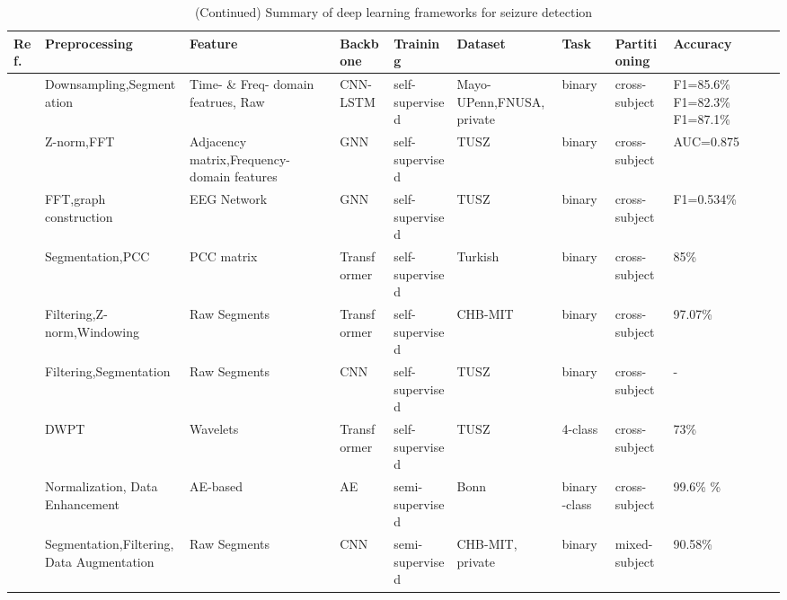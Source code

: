 \begin{table*}[ht]
\renewcommand{\arraystretch}{1.2}
\caption*{(Continued) Summary of deep learning frameworks for seizure detection}
\footnotesize
\begin{tabular}{p{0.4cm}p{2.8cm}p{2cm}p{1.5cm}p{1.9cm}p{1.9cm}p{0.8cm}p{1.8cm}p{1.5cm}}
\hline
\textbf{Ref.} & \textbf{Preprocessing} & \textbf{Feature} & \textbf{Backbone} & \textbf{Training} & \textbf{Dataset} & \textbf{Task} & \textbf{Partitioning} & \textbf{Accuracy} \\
\hline
~\cite{yuan2024ppi} & Downsampling,\newline Segmentation & Time- \& Freq- domain featrues, Raw & CNN-LSTM & self-supervised & Mayo-UPenn,\newline FNUSA, \newline private & binary & cross-subject & F1=85.6\% \newline F1=82.3\% \newline F1=87.1\% \\
~\cite{tang2021self} & Z-norm,FFT & Adjacency matrix,Frequency-domain features & GNN & self-supervised & TUSZ & binary & cross-subject & AUC=0.875 \\
~\cite{ho2023self} & FFT,graph construction & EEG Network & GNN & self-supervised & TUSZ & binary & cross-subject & F1=0.534\% \\
~\cite{lih2023epilepsynet} & Segmentation,PCC & PCC matrix & Transformer & self-supervised & Turkish & binary & cross-subject & 85\% \\
~\cite{XIAO2024105464} & Filtering,Z-norm,\newline Windowing & Raw Segments & Transformer & self-supervised & CHB-MIT & binary & cross-subject & 97.07\% \\
~\cite{li2022spp} & Filtering,Segmentation & Raw Segments &	CNN	& self-supervised & TUSZ & binary & cross-subject &	- \\
~\cite{peng2023wavelet2vec} & DWPT	& Wavelets & Transformer &	self-supervised & TUSZ & 4-class &	cross-subject & 73\%\\
~\cite{Seizure193} & Normalization, \newline Data Enhancement & AE-based & AE & semi-supervised & Bonn & binary \newline
5-class & cross-subject & 99.6\% \newline
96.4\% \\
~\cite{Seizure194} & Segmentation,Filtering,\newline Data Augmentation & Raw Segments & CNN & semi-supervised & CHB-MIT, \newline private & binary & mixed-subject & 90.58\% \\

\end{tabular}
\end{table*}
